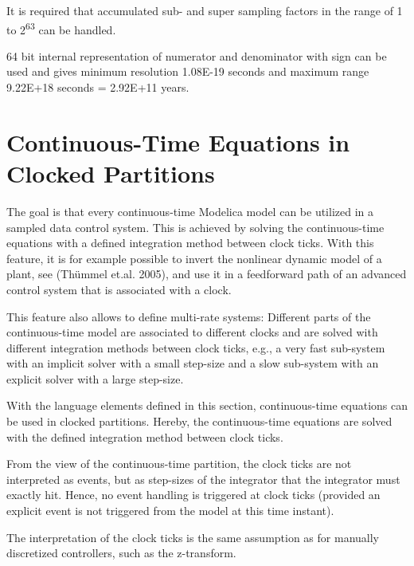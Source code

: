 It is required that accumulated sub- and super sampling factors in the
range of 1 to 2\textsuperscript{63} can be handled.

\begin{nonnormative}
64 bit internal representation of numerator and denominator with sign can be used and gives minimum resolution 1.08E-19 seconds and maximum range 9.22E+18 seconds = 2.92E+11 years.
\end{nonnormative}

\section{Continuous-Time Equations in Clocked Partitions}\label{continuous-time-equations-in-clocked-partitions}

\begin{nonnormative}
The goal is that every continuous-time Modelica model can be utilized in a sampled data control system.  This is achieved by solving the continuous-time equations with a defined
integration method between clock ticks.  With this feature, it is for example possible to invert the nonlinear dynamic model of a plant, see (Thümmel et.al. 2005), and use it in
a feedforward path of an advanced control system that is associated with a clock.

This feature also allows to define multi-rate systems: Different parts of the continuous-time model are associated to different clocks and are solved with different integration
methods between clock ticks, e.g., a very fast sub-system with an implicit solver with a small step-size and a slow sub-system with an explicit solver with a large step-size.
\end{nonnormative}

With the language elements defined in this section, continuous-time
equations can be used in clocked partitions. Hereby, the continuous-time
equations are solved with the defined integration method between clock
ticks.

From the view of the continuous-time partition, the clock ticks are not interpreted as events, but as step-sizes of the integrator that the integrator must exactly hit.
Hence, no event handling is triggered at clock ticks (provided an explicit event is not triggered from the model at this time instant).

\begin{nonnormative}
The interpretation of the clock ticks is the same assumption as for manually discretized controllers, such as the z-transform.
\end{nonnormative}

